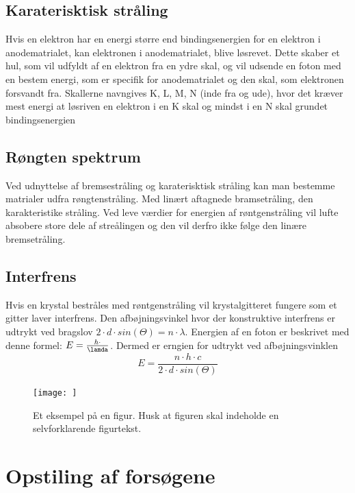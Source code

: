 \documentclass[a4paper,twoside]{article}
\begin{document}
\subsection{Karaterisktisk stråling}
Hvis en elektron har en energi større end bindingsenergien for en elektron i anodematrialet, kan elektronen i anodematrialet, blive løsrevet. Dette skaber et hul, som vil udfyldt af en elektron fra en ydre skal, og vil udsende en foton med en bestem energi, som er specifik for anodematrialet og den skal, som elektronen forsvandt fra. Skallerne navngives K, L, M, N (inde fra og ude), hvor det kræver mest energi at løsriven en elektron i en K skal og mindst i en N skal grundet bindingsenergien

\subsection{Røngten spektrum}
Ved udnyttelse af bremsestråling og karaterisktisk stråling kan man bestemme matrialer udfra røngtenstråling. Med linært aftagnede bramsetråling, den karakteristike stråling. Ved leve værdier for energien af røntgenstråling vil lufte absobere store dele af streålingen og den vil derfro ikke følge den linære bremsetråling.

\subsection{Interfrens}
Hvis en krystal bestråles med røntgenstråling vil krystalgitteret fungere som et gitter laver interfrens. Den afbøjningsvinkel hvor der konstruktive interfrens er udtrykt ved bragslov $2\cdot d \cdot sin(\Theta)=n\cdot \lambda$. Energien af en foton er beskrivet med denne formel: $E=\frac{h\cdot}{\lamda}$. Dermed er erngien for udtrykt ved afbøjningsvinklen 
\begin{equation}
    E=\frac{n\cdot h\cdot c}{2\cdot d\cdot sin(\Theta)}
\end{equation}



\begin{figure}
\begin{centering}
\texttt{[image: ]}
\par\end{centering}
\caption{\label{cap:nerd_sniping}Et eksempel på en figur. Husk at figuren skal indeholde en selvforklarende figurtekst.}
\end{figure}

\section{Opstiling af forsøgene}
\end{document}
